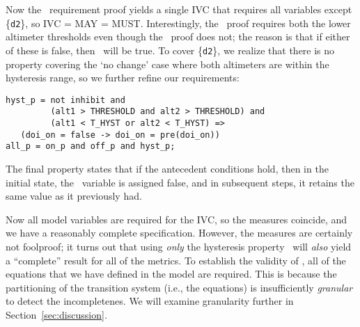 \noindent Now the \allp\ requirement proof yields a single IVC that requires all variables except \{\texttt{d2}\}, so IVC = MAY = MUST.  Interestingly, the \offp\ proof requires both the lower altimeter thresholds even though the \onp\ proof does not; the reason is that if either of these is false, then \doion\ will be true.  To cover \{\texttt{d2}\}, we realize that there is no property covering the `no change' case where both altimeters are within the hysteresis range, so we further refine our requirements:

{\smaller
\begin{verbatim}
hyst_p = not inhibit and
         (alt1 > THRESHOLD and alt2 > THRESHOLD) and
         (alt1 < T_HYST or alt2 < T_HYST) =>
   (doi_on = false -> doi_on = pre(doi_on))
all_p = on_p and off_p and hyst_p;
\end{verbatim}
}
\noindent The final property states that if the antecedent conditions hold, then in the initial state, the \doion\ variable is assigned false, and in subsequent steps, it retains the same value as it previously had.

Now all model variables are required for the IVC, so the measures coincide, and we have a reasonably complete specification.  However, the measures are certainly not foolproof; it turns out that using {\em only} the hysteresis property \hystp\ will {\em also} yield a ``complete'' result for all of the metrics.  To establish the validity of \hystp, all of the equations that we have defined in the model are required.  This is because the partitioning of the transition system (i.e., the equations) is insufficiently {\em granular} to detect the incompletenes.
We will examine granularity further in Section~\ref{sec:discussion}.
%
